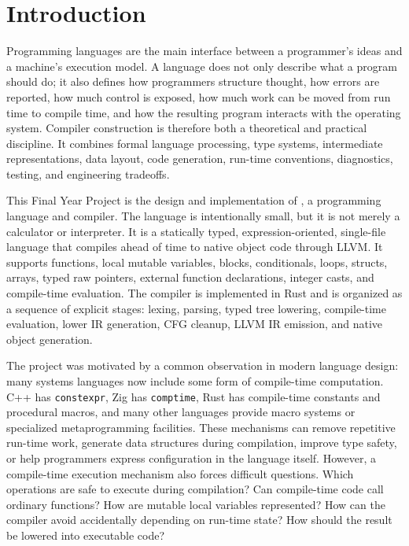 \chapter{Introduction}

Programming languages are the main interface between a programmer's ideas and a
machine's execution model. A language does not only describe what a program
should do; it also defines how programmers structure thought, how errors are
reported, how much control is exposed, how much work can be moved from run time
to compile time, and how the resulting program interacts with the operating
system. Compiler construction is therefore both a theoretical and practical
discipline. It combines formal language processing, type systems, intermediate
representations, data layout, code generation, run-time conventions, diagnostics,
testing, and engineering tradeoffs.

This Final Year Project is the design and implementation of \epl, a programming
language and compiler. The language is intentionally small, but it is not merely
a calculator or interpreter. It is a statically typed, expression-oriented,
single-file language that compiles ahead of time to native object code through
LLVM. It supports functions, local mutable variables, blocks, conditionals,
loops, structs, arrays, typed raw pointers, external function declarations,
integer casts, and compile-time evaluation. The compiler is implemented in Rust
and is organized as a sequence of explicit stages: lexing, parsing, typed tree
lowering, compile-time evaluation, lower IR generation, CFG cleanup, LLVM IR
emission, and native object generation.

The project was motivated by a common observation in modern language design:
many systems languages now include some form of compile-time computation. C++ has
\texttt{constexpr}, Zig has \texttt{comptime}, Rust has compile-time constants
and procedural macros, and many other languages provide macro systems or
specialized metaprogramming facilities. These mechanisms can remove repetitive
run-time work, generate data structures during compilation, improve type safety,
or help programmers express configuration in the language itself. However, a
compile-time execution mechanism also forces difficult questions. Which
operations are safe to execute during compilation? Can compile-time code call
ordinary functions? How are mutable local variables represented? How can the
compiler avoid accidentally depending on run-time state? How should the result be
lowered into executable code?

